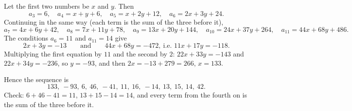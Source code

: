 Let the first two numbers be $x$ and $y$. Then
\[
a_3=6,\quad a_4=x+y+6,\quad a_5=x+2y+12,\quad a_6=2x+3y+24 .
\]
Continuing in the same way (each term is the sum of the three before it),
\[
a_7=4x+6y+42,\quad a_8=7x+11y+78,\quad a_9=13x+20y+144,\quad a_{10}=24x+37y+264,\quad a_{11}=44x+68y+486 .
\]
The conditions $a_6=11$ and $a_{11}=14$ give
\[
2x+3y=-13\qquad\text{and}\qquad 44x+68y=-472,\ \text{i.e. } 11x+17y=-118 .
\]
Multiplying the first equation by $11$ and the second by $2$: $22x+33y=-143$ and $22x+34y=-236$, so $y=-93$, and then $2x=-13+279=266$, $x=133$.

Hence the sequence is
\[
\boxed{133,\ -93,\ 6,\ 46,\ -41,\ 11,\ 16,\ -14,\ 13,\ 15,\ 14,\ 42}.
\]
Check: $6+46-41=11$, $13+15-14=14$, and every term from the fourth on is the sum of the three before it.
